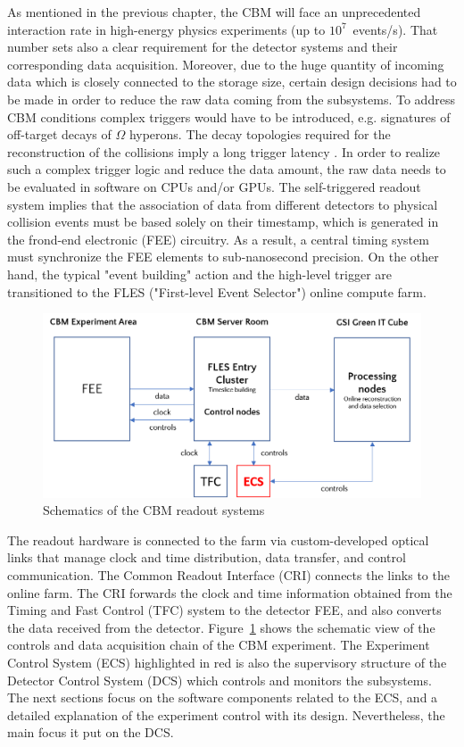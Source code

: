 As mentioned in the previous chapter, the \gls{CBM} will face an unprecedented interaction rate in high-energy physics experiments (up to $10^{7}$~events/s). That number sets also a clear requirement for the detector systems and their corresponding data acquisition. Moreover, due to the huge quantity of incoming data which is closely connected to the storage size, certain design decisions had to be made in order to reduce the raw data coming from the subsystems. To address \gls{CBM} conditions complex triggers would have to be introduced, e.g. signatures of off-target decays of $\Omega$ hyperons. The decay topologies required for the reconstruction of the collisions imply a long trigger latency \cite{Friese_2017}. In order to realize such a complex trigger logic and reduce the data amount, the raw data needs to be evaluated in software on \gls{CPU}s and/or \gls{GPU}s. The self-triggered readout system implies that the association of data from different detectors to physical collision events must be based solely on their timestamp, which is generated in the frond-end electronic (\gls{FEE}) circuitry. As a result, a central timing system must synchronize the \gls{FEE} elements to sub-nanosecond precision. On the other hand, the typical "event building" action and the high-level trigger are transitioned to the \gls{FLES} ("First-level Event Selector") online compute farm. 

\begin{figure}[h!]
\centering
\includegraphics[width=0.8\columnwidth]{Chapter3/Controls/images/online.png}
\caption{Schematics of the CBM readout systems}
\label{fig_controls}
\end{figure}
The readout hardware is connected to the farm via custom-developed optical links that manage clock and time distribution, data transfer, and control communication. The Common Readout Interface (\gls{CRI}) connects the links to the online farm. The CRI forwards the clock and time information obtained from the Timing and Fast Control (\gls{TFC}) system to the detector \gls{FEE}, and also converts the data received from the detector. Figure~\ref{fig_controls} shows the schematic view of the controls and data acquisition chain of the \gls{CBM} experiment. The Experiment Control System (\gls{ECS}) highlighted in red is also the supervisory structure of the Detector Control System (\gls{DCS}) which controls and monitors the subsystems. The next sections focus on the software components related to the \gls{ECS}, and a detailed explanation of the experiment control with its design. Nevertheless, the main focus it put on the \gls{DCS}.
